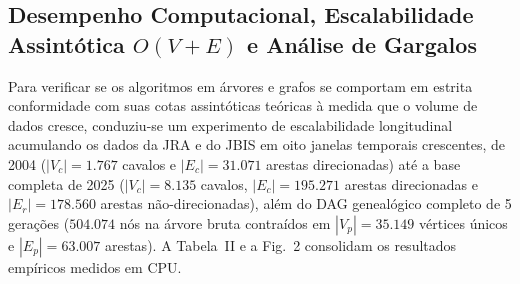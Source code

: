 \documentclass[conference]{IEEEtran}
\begin{document}
\subsection{Desempenho Computacional, Escalabilidade Assintótica $O(V + E)$ e Análise de Gargalos}
Para verificar se os algoritmos em árvores e grafos se comportam em estrita conformidade com suas cotas assintóticas teóricas à medida que o volume de dados cresce, conduziu-se um experimento de escalabilidade longitudinal acumulando os dados da JRA e do JBIS em oito janelas temporais crescentes, de 2004 ($|V_c| = 1.767$ cavalos e $|E_c| = 31.071$ arestas direcionadas) até a base completa de 2025 ($|V_c| = 8.135$ cavalos, $|E_c| = 195.271$ arestas direcionadas e $|E_r| = 178.560$ arestas não-direcionadas), além do DAG genealógico completo de 5 gerações ($504.074$ nós na árvore bruta contraídos em $|V_p| = 35.149$ vértices únicos e $|E_p| = 63.007$ arestas). A Tabela~II e a Fig.~2 consolidam os resultados empíricos medidos em CPU.

\begin{table}[htbp]
\caption{Escalabilidade Empírica, Topologia e Tempo de Execução em CPU ($G_c$ e $G_r$, 2002--2025)}
\begin{center}
\renewcommand{\arraystretch}{1.15}
\setlength{\tabcolsep}{3.0pt}
\label{tab:scalability_aeds2}
\end{center}
\end{table}
\end{document}
